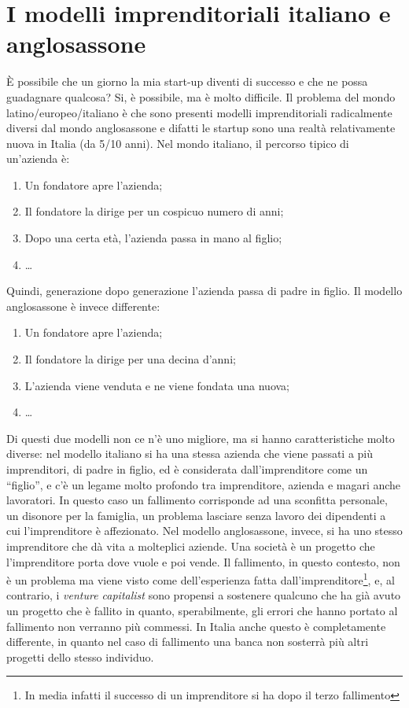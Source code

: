 \section{I modelli imprenditoriali italiano e anglosassone}
È possibile che un giorno la mia start-up diventi di successo e che ne possa
guadagnare qualcosa? Si, è possibile, ma è molto difficile.
Il problema del mondo latino/europeo/italiano è che sono presenti modelli
imprenditoriali radicalmente diversi dal mondo anglosassone e difatti
le startup sono una realtà relativamente nuova in Italia (da 5/10 anni).
Nel mondo italiano, il percorso tipico di un'azienda è:
\begin{enumerate}
 \item Un fondatore apre l'azienda;
 \item Il fondatore la dirige per un cospicuo numero di anni;
 \item Dopo una certa età, l'azienda passa in mano al figlio;
 \item \dots
\end{enumerate}
Quindi, generazione dopo generazione l'azienda passa di padre in figlio.
Il modello anglosassone è invece differente:
\begin{enumerate}
 \item Un fondatore apre l'azienda;
 \item Il fondatore la dirige per una decina d'anni;
 \item L'azienda viene venduta e ne viene fondata una nuova;
 \item \dots
\end{enumerate}
Di questi due modelli non ce n'è uno migliore, ma si hanno caratteristiche
molto diverse: nel modello italiano si ha una stessa azienda che viene passati
a più imprenditori, di padre in figlio, ed è considerata dall'imprenditore come
un ``figlio'', e c'è un legame molto profondo tra imprenditore, azienda e
magari anche lavoratori. In questo caso un fallimento corrisponde ad una
sconfitta personale, un disonore per la famiglia, un problema lasciare senza
lavoro dei dipendenti a cui l'imprenditore è affezionato. Nel modello
anglosassone, invece, si ha uno stesso imprenditore che dà vita a molteplici
aziende. Una società è un progetto che l'imprenditore porta dove vuole e poi
vende. Il fallimento, in questo contesto, non è un problema ma viene visto come
dell'esperienza fatta dall'imprenditore\footnote{In media infatti il successo
di un imprenditore si ha dopo il terzo fallimento}, e, al contrario, i
\textit{venture capitalist} sono propensi a sostenere qualcuno che ha già avuto
un progetto che è fallito in quanto, sperabilmente, gli errori che hanno
portato al fallimento non verranno più commessi. In Italia anche questo è
completamente differente, in quanto nel caso di fallimento una banca non
sosterrà più altri progetti dello stesso individuo.
